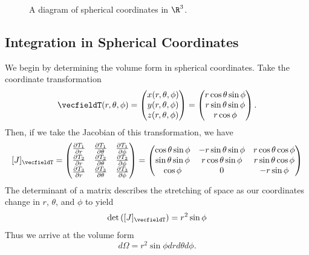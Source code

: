 \begin{figure}[H]
	\label{fig:spherical_coordinates}
	\centering
	\def\svgwidth{0.6\textwidth}
		
		\caption{A diagram of spherical coordinates in $\R^3$.}
\end{figure}

\subsection{Integration in Spherical Coordinates}

We begin by determining the volume form in spherical coordinates. Take the coordinate transformation
\[
\vecfieldT(r,\theta,\phi) = \begin{pmatrix} x(r,\theta,\phi) \\ y(r,\theta,\phi) \\ z(r,\theta,\phi) \end{pmatrix} = \begin{pmatrix} r \cos\theta \sin \phi \\ r \sin \theta \sin \phi \\ r\cos \phi \end{pmatrix}.
\]
Then, if we take the Jacobian of this transformation, we have
\[
[J]_{\vecfieldT} = \begin{pmatrix} \frac{\partial T_1}{\partial r} & \frac{\partial T_1}{\partial \theta} & \frac{\partial T_1}{\partial \phi} \\ \frac{\partial T_2}{\partial r} & \frac{\partial T_2}{\partial \theta} & \frac{\partial T_2}{\partial \phi} \\ \frac{\partial T_3}{\partial r} & \frac{\partial T_3}{\partial \theta} & \frac{\partial T_3}{\partial \phi}  \end{pmatrix} =  \begin{pmatrix} \cos \theta \sin \phi & -r\sin \theta \sin \phi & r\cos \theta \cos \phi \\ \sin \theta \sin \phi & r\cos \theta \sin \phi & r \sin \theta \cos \phi \\ \cos \phi & 0 & -r\sin \phi \end{pmatrix}
\]
The determinant of a matrix describes the stretching of space as our coordinates change in $r$, $\theta$, and $\phi$ to yield
\[
\det \left( [J]_{\vecfieldT}\right) = r^2 \sin \phi
\]
Thus we arrive at the volume form 
\[
d\Omega = r^2 \sin \phi dr d\theta d\phi.
\]


